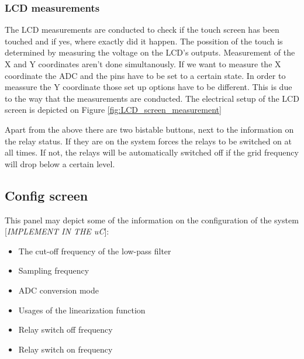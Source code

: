 \subsubsection{LCD measurements}
The LCD measurements are conducted to check if the touch screen has been touched and if yes, where exactly did it happen. The possition of the touch is determined by measuring the voltage on the LCD's outputs. Measurement of the X and Y coordinates aren't done simultanously. If we want to measure the X coordinate the ADC and the pins have to be set to a certain state. In order to meassure the Y coordinate those set up options have to be different. This is due to the way that the measurements are conducted. The electrical setup of the LCD screen is depicted on Figure \ref{fig:LCD_screen_measurement}

Apart from the above there are two bistable buttons, next to the information on the relay status. If they are on the system forces the relays to be switched on at all times. If not, the relays will be automatically  switched off if the grid frequency will drop below a certain level.

\subsection{Config screen}
This panel may depict some of the information on the configuration of the system [\emph{IMPLEMENT IN THE uC}]:
\begin{itemize}
\item The cut-off frequency of the low-pass filter
\item Sampling frequency
\item ADC conversion mode
\item Usages of the linearization function
\item Relay switch off frequency
\item Relay switch on frequency
\end{itemize}

